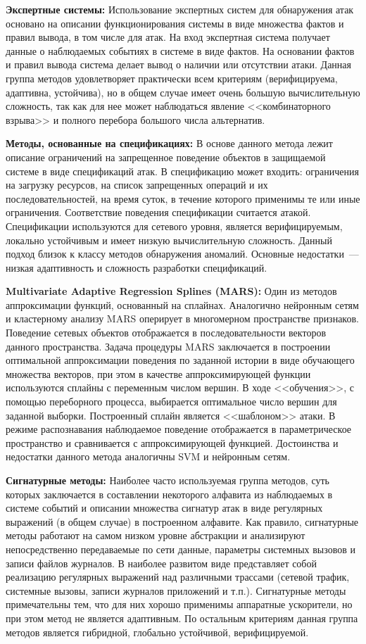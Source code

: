 \textbf{Экспертные системы:} Использование экспертных систем для обнаружения атак основано на описании функционирования системы в виде множества фактов и правил вывода, в том числе для атак. На вход экспертная система получает данные о наблюдаемых событиях в системе в виде фактов. На основании фактов и правил вывода система делает вывод о наличии или отсутствии атаки. Данная группа методов удовлетворяет практически всем критериям (верифицируема, адаптивна, устойчива), но в общем случае имеет очень большую вычислительную сложность, так как для нее может наблюдаться явление <<комбинаторного взрыва>> и полного перебора большого числа альтернатив.

\textbf{Методы, основанные на спецификациях:} В основе данного метода лежит описание ограничений на запрещенное поведение объектов в защищаемой системе в виде спецификаций атак. В спецификацию может входить: ограничения на загрузку ресурсов, на список запрещенных операций и их последовательностей, на время суток, в течение которого применимы те или иные ограничения. Соответствие поведения спецификации считается атакой. Спецификации используются для сетевого уровня, является верифицируемым, локально устойчивым и имеет низкую вычислительную сложность. Данный подход близок к классу методов обнаружения аномалий. Основные недостатки~--- низкая адаптивность и сложность разработки спецификаций.

\textbf{Multivariate Adaptive Regression Splines (MARS):} Один из методов аппроксимации функций, основанный на сплайнах. Аналогично нейронным сетям и кластерному анализу MARS оперирует в многомерном пространстве признаков. Поведение сетевых объектов отображается в последовательности векторов данного пространства. Задача процедуры MARS заключается в построении оптимальной аппроксимации поведения по заданной истории в виде обучающего множества векторов, при этом в качестве аппроксимирующей функции используются сплайны с переменным числом вершин. В ходе <<обучения>>, с помощью переборного процесса, выбирается оптимальное число вершин для заданной выборки. Построенный сплайн является <<шаблоном>> атаки. В режиме распознавания наблюдаемое поведение отображается в параметрическое пространство и сравнивается с аппроксимирующей функцией. Достоинства и недостатки данного метода аналогичны SVM и нейронным сетям.

\textbf{Сигнатурные методы:} Наиболее часто используемая группа методов, суть которых заключается в составлении некоторого алфавита из наблюдаемых в системе событий и описании множества сигнатур атак в виде регулярных выражений (в общем случае) в построенном алфавите. Как правило, сигнатурные методы работают на самом низком уровне абстракции и анализируют непосредственно передаваемые по сети данные, параметры системных вызовов и записи файлов журналов. В наиболее развитом виде представляет собой реализацию регулярных выражений над различными трассами (сетевой трафик, системные вызовы, записи журналов приложений и т.п.). Сигнатурные методы примечательны тем, что для них хорошо применимы аппаратные ускорители, но при этом метод не является адаптивным. По остальным критериям данная группа методов является гибридной, глобально устойчивой, верифицируемой. 

